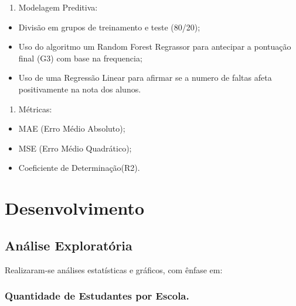 \documentclass[
  letterpaper,
  DIV=11,
  numbers=noendperiod,
  openany]{scrreprt}
\providecommand{\tightlist}{%
  \setlength{\itemsep}{0pt}\setlength{\parskip}{0pt}}
\begin{document}
\begin{enumerate}
\def\labelenumi{\arabic{enumi}.}
\setcounter{enumi}{3}
\tightlist
\item
  Modelagem Preditiva:
\end{enumerate}

\begin{itemize}
\tightlist
\item
  Divisão em grupos de treinamento e teste (80/20);
\item
  Uso do algoritmo um Random Forest Regrassor para antecipar a pontuação
  final (G3) com base na frequencia;
\item
  Uso de uma Regressão Linear para afirmar se a numero de faltas afeta
  positivamente na nota dos alunos.
\end{itemize}

\begin{enumerate}
\def\labelenumi{\arabic{enumi}.}
\setcounter{enumi}{4}
\tightlist
\item
  Métricas:
\end{enumerate}

\begin{itemize}
\tightlist
\item
  MAE (Erro Médio Absoluto);
\item
  MSE (Erro Médio Quadrático);
\item
  Coeficiente de Determinação(R2).
\end{itemize}


\chapter{Desenvolvimento}\label{desenvolvimento}

\section{Análise Exploratória}\label{anuxe1lise-exploratuxf3ria}

Realizaram-se análises estatísticas e gráficos, com ênfase em:

\subsection{Quantidade de Estudantes por
Escola.}\label{quantidade-de-estudantes-por-escola.}
\end{document}
